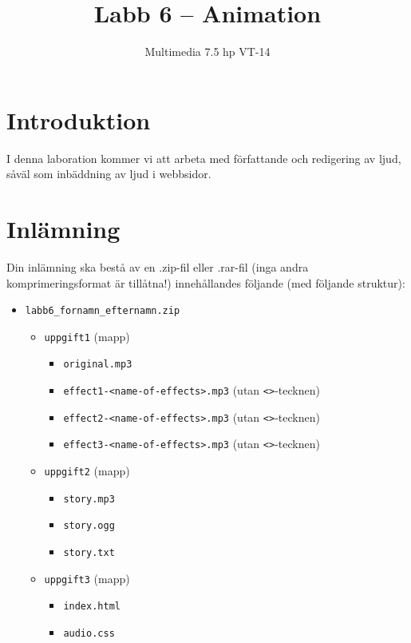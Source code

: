 \documentclass[12pt]{article}
\date{}
\title{ Labb 6 -- Animation }
\author{ Multimedia 7.5 hp VT-14 }
\begin{document}
\maketitle
\vspace{-3.5em}




\section{Introduktion}
I denna laboration kommer vi att arbeta med författande och redigering av ljud, såväl som inbäddning av ljud i webbsidor.

\section{Inlämning}
Din inlämning ska bestå av en .zip-fil eller .rar-fil (inga andra komprimeringsformat är tillåtna!) innehållandes följande (med följande struktur):
  \begin{itemize}
    \item \texttt{labb6\_fornamn\_efternamn.zip}
      \vspace{-0.5em}
      \begin{itemize}
        \item \texttt{uppgift1} (mapp)
          \begin{itemize}
            \item \texttt{original.mp3}
            \item \texttt{effect1-<name-of-effects>.mp3} (utan \texttt{<>}-tecknen)
            \item \texttt{effect2-<name-of-effects>.mp3} (utan \texttt{<>}-tecknen)
            \item \texttt{effect3-<name-of-effects>.mp3} (utan \texttt{<>}-tecknen)
          \end{itemize}
        \item \texttt{uppgift2} (mapp)
          \begin{itemize}
            \item \texttt{story.mp3}
            \item \texttt{story.ogg}
            \item \texttt{story.txt}
          \end{itemize}
        \item \texttt{uppgift3} (mapp)
          \begin{itemize}
            \item \texttt{index.html}
            \item \texttt{audio.css}
          \end{itemize}
    \end{itemize}
  \end{itemize}
\end{document}
